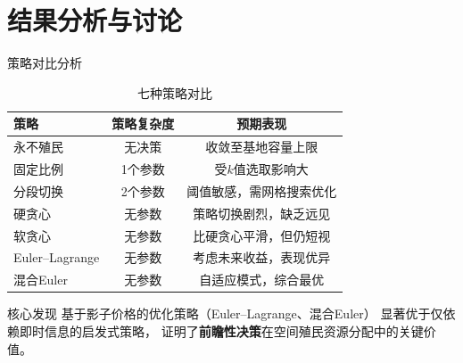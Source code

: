 \documentclass[aspectratio=169, 11pt]{beamer}
\begin{document}
\section{结果分析与讨论}

\begin{frame}{策略对比分析}
  \begin{table}
    \centering
    \small
    \begin{tabular}{lcc}
      \toprule
      \textbf{策略} & \textbf{策略复杂度} & \textbf{预期表现} \\
      \midrule
      永不殖民       & 无决策       & 收敛至基地容量上限 \\
      固定比例       & 1个参数      & 受$k$值选取影响大 \\
      分段切换       & 2个参数      & 阈值敏感，需网格搜索优化 \\
      硬贪心         & 无参数       & 策略切换剧烈，缺乏远见 \\
      软贪心         & 无参数       & 比硬贪心平滑，但仍短视 \\
      Euler--Lagrange & 无参数     & 考虑未来收益，表现优异 \\
      混合Euler      & 无参数       & 自适应模式，综合最优 \\
      \bottomrule
    \end{tabular}
    \caption{七种策略对比}
  \end{table}

  \begin{alertblock}{核心发现}
    基于影子价格的优化策略（Euler--Lagrange、混合Euler）
    显著优于仅依赖即时信息的启发式策略，
    证明了\textbf{前瞻性决策}在空间殖民资源分配中的关键价值。
  \end{alertblock}

\end{frame}
\end{document}
